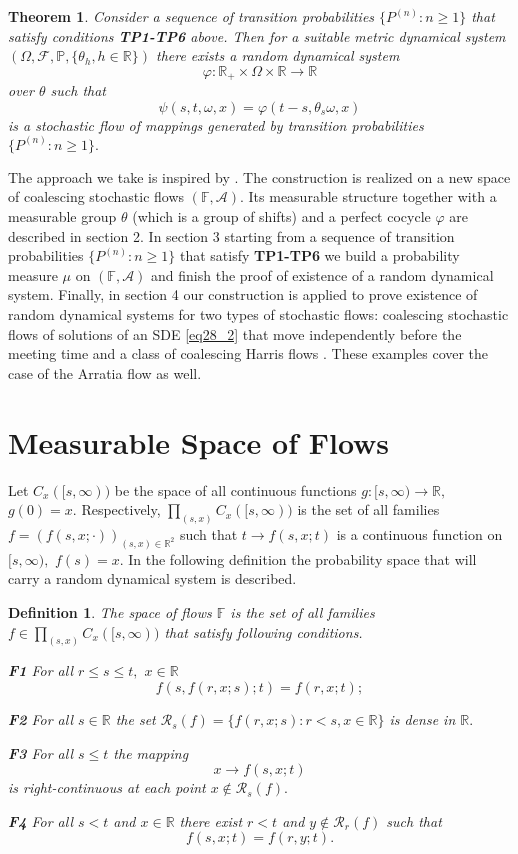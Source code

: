 \documentclass[a4paper,12pt]{article}
\newcommand{\1}{1\!\!\,{\rm I}}
\theoremstyle{plain}
\newtheorem{theorem}{Theorem}[section]
\newtheorem{definition}{Definition}[section]
\begin{document}
\begin{theorem}
	\label{thm1} 	Consider a sequence  of transition probabilities $\{P^{(n)}:n\geq 1\}$  that satisfy conditions {\bf TP1-TP6} above. Then for a suitable metric dynamical system $(\Omega,\mathcal{F},\mathbb{P}, \{\theta_h,h\in \mathbb{R}\})$ there exists a random dynamical system 
	$$
	\varphi: \mathbb{R}_+\times\Omega\times \mathbb{R}\to \mathbb{R}
	$$
	over $\theta$ such that
	$$
	\psi(s,t,\omega,x)=\varphi(t-s,\theta_s \omega,x)
	$$
	is a stochastic flow of mappings generated by transition probabilities $\{P^{(n)}:n\geq 1\}.$
	
\end{theorem}

The approach we take is inspired by \cite{Darling, FINR, D2}. The construction is realized on a new space of coalescing stochastic flows $(\mathbb{F},\mathcal{A})$. Its measurable structure together with a measurable group $\theta$ (which is a group of shifts) and a perfect cocycle $\varphi$ are described in section 2. In section 3 starting from a sequence of transition probabilities $\{P^{(n)}:n\geq 1\}$ that satisfy {\bf TP1-TP6} we build a probability measure $\mu$ on $(\mathbb{F},\mathcal{A})$ and finish the proof of existence of a random dynamical system. Finally, in section 4 our construction is applied to prove existence of random dynamical systems for two types of stochastic flows: coalescing stochastic flows of solutions of an SDE \eqref{eq28_2} that move independently before the meeting time and a class of coalescing Harris flows \cite{Harris}. These examples cover the case of the Arratia flow as well.

\section{Measurable Space of Flows}
Let $C_x([s,\infty))$ be the space of all continuous functions $g:[s,\infty)\to\mathbb{R},$ $g(0)=x.$ Respectively, $\prod_{(s,x)}C_x([s,\infty))$ is the set of all families $f=(f(s,x;\cdot))_{(s,x)\in \mathbb{R}^2}$ such that $t\to f(s,x;t)$ is a continuous function on $[s,\infty),$ $f(s)=x.$ In the following definition the probability space that will carry a random dynamical system is described. 

\begin{definition}\label{def2} The space of flows $\mathbb{F}$ is the set of all families $f\in \prod_{(s,x)}C_x([s,\infty))$  that satisfy following conditions.
	
	
	{\bf F1} For all $r\leq s\leq t,$ $x\in\mathbb{R}$
	$$
	f(s,f(r,x;s);t)=f(r,x;t);
	$$
	
	{\bf F2} For all $s\in\mathbb{R}$ the set $\mathcal{R}_s(f)=\{f(r,x;s):r<s,x\in\mathbb{R}\}$  is dense in $\mathbb{R}.$
	
	{\bf F3} For all $s\leq t$ the mapping
	$$
	x\to f(s,x;t)
	$$
	is right-continuous at each point $x\not\in\mathcal{R}_s(f).$
	
	{\bf F4} For all $s<t$ and $x\in\mathbb{R}$ there exist $r<t$ and $y\not\in\mathcal{R}_r(f)$ such that
	$$
	f(s,x;t)=f(r,y;t).
	$$
	
	
\end{definition}
\end{document}
